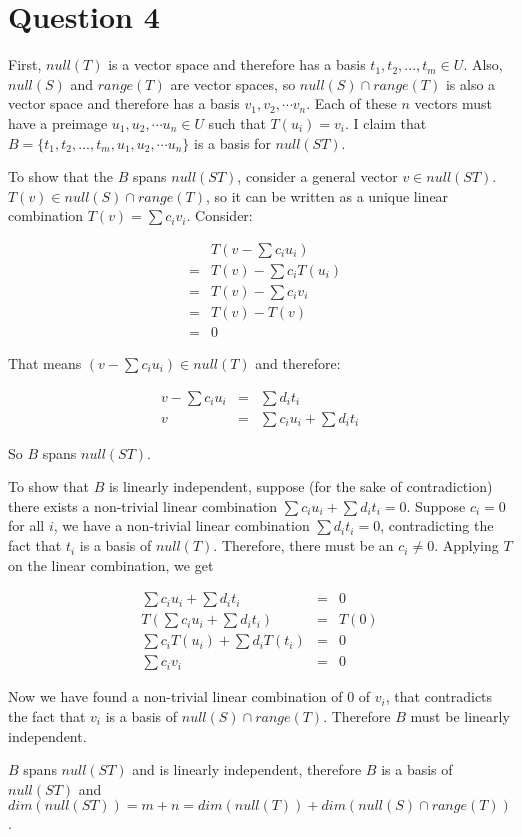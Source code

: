 \section*{Question 4}
First, $ null(T) $ is a vector space and therefore has a basis $ t_1, t_2, ..., t_m \in U $. Also, $ null(S) $ and $ range(T) $ are vector spaces, so $ null(S) \cap range(T) $ is also a vector space and therefore has a basis $ v_1, v_2, \cdots v_n $. Each of these $ n $ vectors must have a preimage $ u_1, u_2, \cdots u_n \in U $ such that $ T(u_i) = v_i $. I claim that $ B = \{ t_1, t_2, ..., t_m, u_1, u_2, \cdots u_n \} $ is a basis for $ null(ST) $.

To show that the $ B $ spans $ null(ST) $, consider a general vector $ v \in null(ST) $. $ T(v) \in null(S) \cap range(T) $, so it can be written as a unique linear combination $ T(v) = \sum c_i v_i $. Consider: 

\begin{eqnarray*}
  & & T(v - \sum c_i u_i) \\
  &=& T(v) - \sum c_i T(u_i) \\
  &=& T(v) - \sum c_i v_i \\
  &=& T(v) - T(v) \\
  &=& 0 
\end{eqnarray*}

That means $ (v - \sum c_i u_i) \in null(T) $ and therefore:

\begin{eqnarray*}
  v - \sum c_i u_i &=& \sum d_i t_i \\
                 v &=& \sum c_i u_i + \sum d_i t_i 
\end{eqnarray*}

So $ B $ spans $ null(ST) $.

To show that $ B $ is linearly independent, suppose (for the sake of contradiction) there exists a non-trivial linear combination $ \sum c_i u_i + \sum d_i t_i = 0 $. Suppose $ c_i = 0 $ for all $ i $, we have a non-trivial linear combination $ \sum d_i t_i = 0 $, contradicting the fact that $ t_i $ is a basis of $ null(T) $. Therefore, there must be an $ c_i \ne 0 $. Applying $ T $ on the linear combination, we get 

\begin{eqnarray*}
     \sum c_i u_i + \sum d_i t_i &=& 0 \\
  T(\sum c_i u_i + \sum d_i t_i) &=& T(0) \\
  \sum c_i T(u_i) + \sum d_i T(t_i) &=& 0 \\
  \sum c_i v_i &=& 0 
\end{eqnarray*}

Now we have found a non-trivial linear combination of 0 of $ v_i $, that contradicts the fact that $ v_i $ is a basis of $ null(S) \cap range(T) $. Therefore $ B $ must be linearly independent.

$ B $ spans $ null(ST) $ and is linearly independent, therefore $ B $ is a basis of $ null(ST) $ and $ dim(null(ST)) = m + n = dim(null(T)) + dim (null(S) \cap range(T)) $.